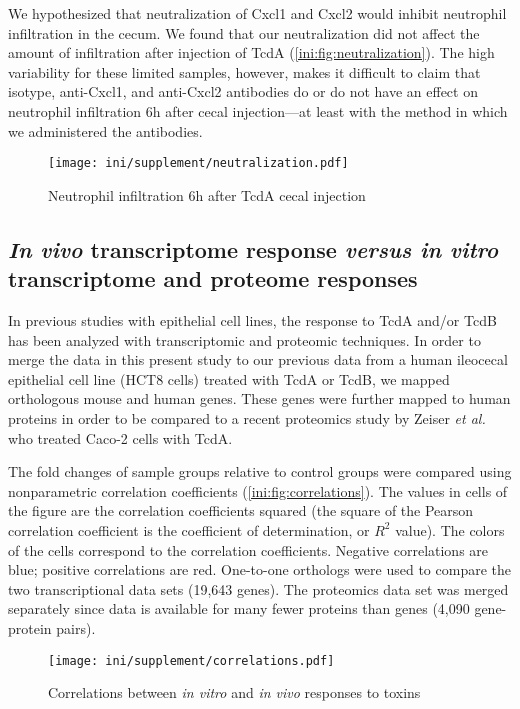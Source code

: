 We hypothesized that neutralization of Cxcl1 and Cxcl2
would inhibit neutrophil infiltration in the cecum. We found that 
our neutralization did not affect the amount of infiltration after injection
of TcdA (\autoref{ini:fig:neutralization}). The high variability for these 
limited samples, however,
makes it difficult to claim that isotype, anti-Cxcl1, and anti-Cxcl2 antibodies
do or do not have an effect on neutrophil infiltration 6h after cecal injection---at 
least with the method in which we administered the antibodies.

\begin{figure}[ht]
\centering
\texttt{[image: ini/supplement/neutralization.pdf]}
\caption{Neutrophil infiltration 6h after TcdA cecal injection}
\label{ini:fig:neutralization}
\end{figure}


\subsection{\emph{In vivo} transcriptome response \emph{versus
            in vitro} transcriptome and proteome responses}

In previous studies with epithelial cell lines, the response 
to TcdA and/or TcdB has been analyzed with transcriptomic and 
proteomic techniques. In order to merge the data in this present study
to our previous data from a human ileocecal epithelial
cell line (HCT8 cells) treated with TcdA or TcdB, we mapped orthologous
mouse and human genes.\autocite{DAuria2012} These genes were further mapped
to human proteins in order to be compared to a recent proteomics study
by Zeiser \emph{et al.} who treated Caco-2 cells with TcdA.\autocite{Zeiser2013}

The fold changes of sample groups relative
to control groups were compared using nonparametric correlation
coefficients (\autoref{ini:fig:correlations}). The values in cells of the figure
are the correlation coefficients squared (the square of the Pearson
correlation coefficient is the coefficient of determination, or $R^2$ value).
The colors of the cells correspond to the correlation coefficients. Negative
correlations are blue; positive correlations are red.
One-to-one orthologs were used to compare the two
transcriptional data sets (19,643 genes). The proteomics data
set was merged separately since data is available for many fewer
proteins than genes (4,090 gene-protein pairs).

\begin{figure}[ht]
\centering
\texttt{[image: ini/supplement/correlations.pdf]}
\caption{Correlations between \emph{in vitro} and \emph{in vivo} responses to toxins}
\label{ini:fig:correlations}
\end{figure}

